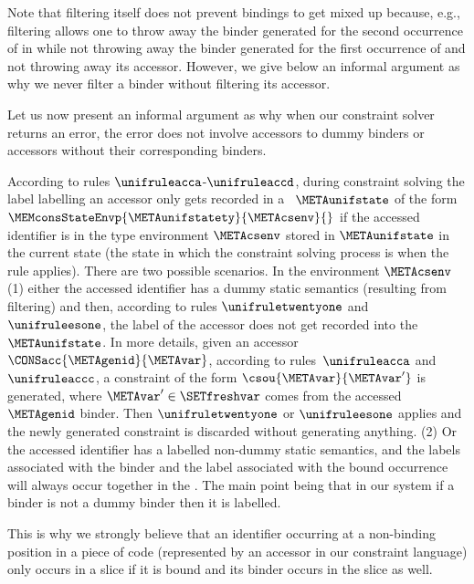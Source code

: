\documentclass{jfp1}
\begin{document}
Note that filtering itself does not prevent bindings to get mixed up
because, e.g., filtering allows one to throw away the binder
generated for the second occurrence of  in
 while not throwing away the binder
generated for the first occurrence of  and not
throwing away its accessor.  However, we give below an informal
argument as why we never filter a binder without filtering its
accessor.

Let us now present an informal argument as why when our constraint
solver returns an error, the error does not involve accessors to dummy
binders or accessors without their corresponding binders.

According to rules $\unifruleacca$-$\unifruleaccd$, during constraint
solving the label labelling an accessor only gets recorded in a
\CONTEXT\ $\METAunifstate$ of the form
$\MEMconsStateEnvp{\METAunifstatety}{\METAcsenv}{}$ if the accessed
identifier is in the type environment $\METAcsenv$ stored in
$\METAunifstate$ in the current state (the state in which the
constraint solving process is when the rule applies).
%
There are two possible scenarios.
%
In the environment $\METAcsenv$
(1) either the accessed identifier has a dummy static
semantics (resulting from filtering) and then, according to rules
$\unifruletwentyone$ and $\unifruleesone$,
the label of the accessor does not get recorded into the
\CONTEXT\ $\METAunifstate$.
%
In more details, given an accessor $\CONSacc{\METAgenid}{\METAvar}$,
according to rules~$\unifruleacca$ and $\unifruleaccc$, a constraint
of the form $\csou{\METAvar}{\METAvar'}$ is generated, where
$\METAvar'\in\SETfreshvar$ comes from the accessed $\METAgenid$ binder.
Then $\unifruletwentyone$ or $\unifruleesone$
applies and the newly generated constraint is discarded without
generating anything.
%
(2) Or the accessed identifier has a labelled non-dummy static
semantics, and the labels associated with the binder and the label
associated with the bound occurrence will always occur together in the
\CONTEXT.
%
The main point being that in our system if a binder is not a dummy
binder then it is labelled.

This is why we strongly believe that an identifier occurring at a
non-binding position in a piece of code (represented by an accessor in
our constraint language) only occurs in a slice if it is bound and its
binder occurs in the slice as well.
\end{document}
